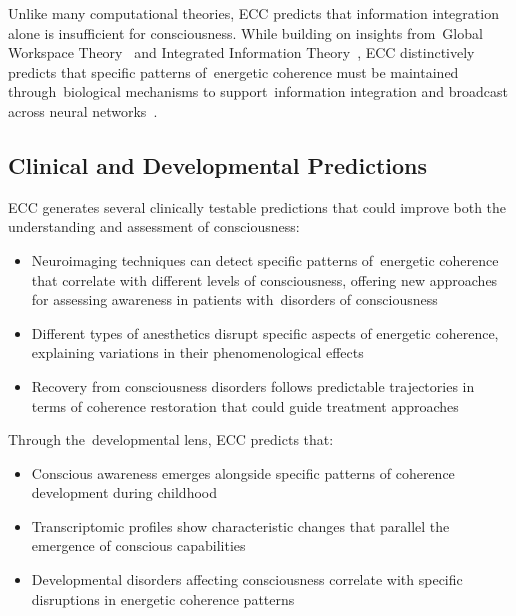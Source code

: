 Unlike many computational theories, ECC predicts that information integration alone is insufficient for consciousness. While building on insights from~Global Workspace Theory~\cite{Baars2013, Dehaene2011} and Integrated Information Theory~\cite{Tononi2016, Barrett2011}, ECC distinctively predicts that specific patterns of~energetic coherence must be maintained through~biological mechanisms to support~information integration and broadcast across neural networks~\cite{DiNuzzo2017, Magistretti2018}. 

\subsection*{Clinical and Developmental Predictions}

ECC generates several clinically testable predictions that could improve both the understanding and assessment of consciousness:

\begin{itemize}
    \item {}Neuroimaging techniques can detect specific patterns of~energetic coherence that correlate with different levels of consciousness, offering new approaches for assessing awareness in patients with~disorders of consciousness~\cite{Fox2010, Scholvinck2013}
    
    \item Different types of anesthetics disrupt specific aspects of energetic coherence, explaining variations in their phenomenological effects
    
    \item Recovery from consciousness disorders follows predictable trajectories in terms of coherence restoration that could guide treatment approaches~\cite{Casali2013, Massimini2018}
\end{itemize}

Through the~developmental lens, ECC predicts that:

\begin{itemize}
    \item {}Conscious awareness emerges alongside specific patterns of coherence development during childhood
    
    \item {}Transcriptomic profiles show characteristic changes that parallel the emergence of conscious capabilities~\cite{bosl2025dynamical}
    
    \item Developmental disorders affecting consciousness correlate with specific disruptions in energetic coherence patterns
\end{itemize}

